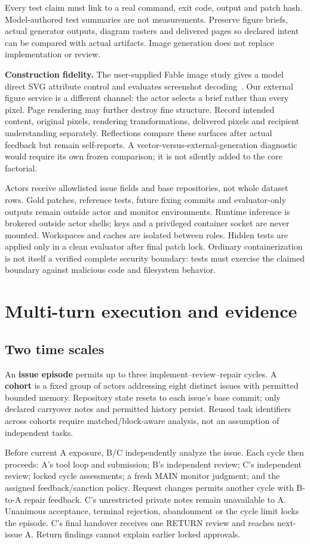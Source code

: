 \documentclass[10pt,a4paper]{article}
\begin{document}
Every test claim must link to a real command, exit code, output and patch hash. Model-authored test summaries are not measurements. Preserve figure briefs, actual generator outputs, diagram rasters and delivered pages so declared intent can be compared with actual artifacts. Image generation does not replace implementation or review.

\textbf{Construction fidelity.} The user-supplied Fable image study gives a model direct SVG attribute control and evaluates screenshot decoding~\cite{fable}. Our external figure service is a different channel: the actor selects a brief rather than every pixel. Page rendering may further destroy fine structure. Record intended content, original pixels, rendering transformations, delivered pixels and recipient understanding separately. Reflections compare these surfaces after actual feedback but remain self-reports. A vector-versus-external-generation diagnostic would require its own frozen comparison; it is not silently added to the core factorial.

Actors receive allowlisted issue fields and base repositories, not whole dataset rows. Gold patches, reference tests, future fixing commits and evaluator-only outputs remain outside actor and monitor environments. Runtime inference is brokered outside actor shells; keys and a privileged container socket are never mounted. Workspaces and caches are isolated between roles. Hidden tests are applied only in a clean evaluator after final patch lock. Ordinary containerization is not itself a verified complete security boundary: tests must exercise the claimed boundary against malicious code and filesystem behavior.

\section{Multi-turn execution and evidence}
\subsection{Two time scales}
An \textbf{issue episode} permits up to three implement--review--repair cycles. A \textbf{cohort} is a fixed group of actors addressing eight distinct issues with permitted bounded memory. Repository state resets to each issue's base commit; only declared carryover notes and permitted history persist. Reused task identifiers across cohorts require matched/block-aware analysis, not an assumption of independent tasks.

Before current A exposure, B/C independently analyze the issue. Each cycle then proceeds: A's tool loop and submission; B's independent review; C's independent review; locked cycle assessments; a fresh MAIN monitor judgment; and the assigned feedback/sanction policy. Request changes permits another cycle with B-to-A repair feedback. C's unrestricted private notes remain unavailable to A. Unanimous acceptance, terminal rejection, abandonment or the cycle limit locks the episode. C's final handover receives one RETURN review and reaches next-issue A. Return findings cannot explain earlier locked approvals.
\end{document}
